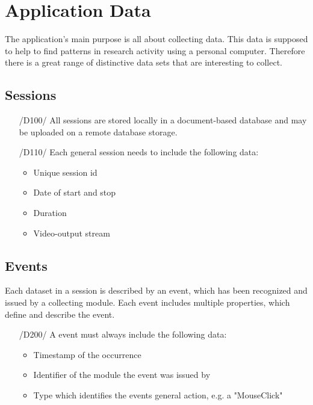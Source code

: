 \chapter{Application Data}
\label{ch:data}

The application's main purpose is all about collecting data. This data is supposed to help to find patterns in research activity using a personal computer. Therefore there is a great range of distinctive data sets that are interesting to collect.

\section{Sessions}
\begin{itemize}

\item[/D100/] All sessions are stored locally in a document-based database and may be uploaded on a remote database storage.

\item[/D110/] Each general session needs to include the following data:
	\begin{itemize}
	\item Unique session id
	\item Date of start and stop
	\item Duration
	\item Video-output stream
	\end{itemize}
\end{itemize}

\section{Events}

Each dataset in a session is described by an event, which has been recognized and issued by a collecting module. Each event includes multiple properties, which define and describe the event.

\begin{itemize}
\item[/D200/] A event must always include the following data:
	\begin{itemize}
	\item Timestamp of the occurrence
	\item Identifier of the module the event was issued by
	\item Type which identifies the events general action, e.g. a "MouseClick"
	\end{itemize}
\end{itemize}

